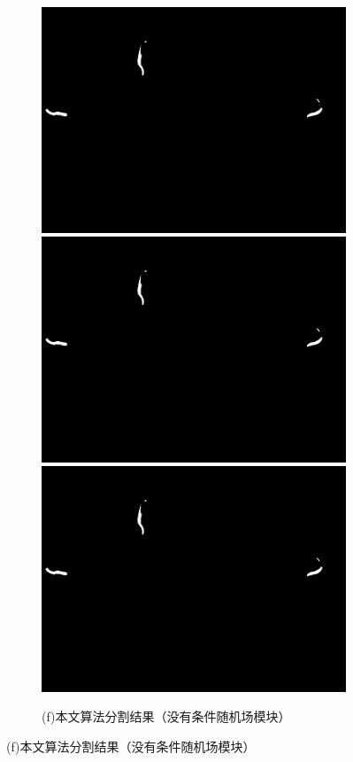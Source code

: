 \begin{figure}[!htp]
	\addtocounter{subfigure}{5}
		\centering
		\ContinuedFloat
	  \begin{subfigure}{\linewidth}
		\centering
		\begin{minipage}[b]{\linewidth}
		\includegraphics[width=0.33\linewidth,natwidth=800,natheight=600]{figure/chap3/test2/441.orgin.1051.jpg}
		\includegraphics[width=0.33\linewidth,natwidth=800,natheight=600]{figure/chap3/test2/441.orgin.1051.jpg}
		\includegraphics[width=0.33\linewidth,natwidth=800,natheight=600]{figure/chap3/test2/441.orgin.1051.jpg}
		\end{minipage}
		\caption*{(f)本文算法分割结果（没有条件随机场模块）}
	  \end{subfigure}


\end{figure}
